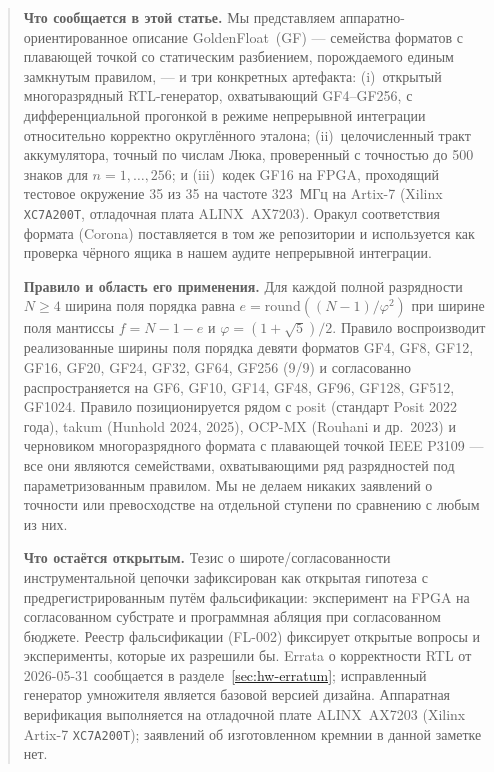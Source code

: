 \documentclass[11pt,a4paper]{article}
\theoremstyle{plain}
\begin{document}
\begin{abstract}
\noindent\textbf{Что сообщается в этой статье.}
Мы представляем аппаратно-ориентированное описание GoldenFloat~(GF) ---
семейства форматов с плавающей точкой со статическим разбиением, порождаемого
единым замкнутым правилом, --- и три конкретных артефакта: (i)~открытый
многоразрядный RTL-генератор, охватывающий GF4--GF256, с дифференциальной
прогонкой в режиме непрерывной интеграции относительно корректно округлённого
эталона; (ii)~целочисленный тракт аккумулятора, точный по числам Люка, проверенный с
точностью до 500 знаков для \(n = 1,\dots,256\); и (iii)~кодек GF16 на FPGA,
проходящий тестовое окружение 35 из 35 на частоте 323~МГц на Artix-7
(Xilinx \texttt{XC7A200T}, отладочная плата ALINX~AX7203). Оракул соответствия формата (Corona) поставляется в том же
репозитории и используется как проверка чёрного ящика в нашем аудите
непрерывной интеграции.

\noindent\textbf{Правило и область его применения.}
Для каждой полной разрядности \(N \ge 4\) ширина поля порядка равна
\(e = \mathrm{round}((N-1)/\varphi^{2})\) при ширине поля мантиссы
\(f = N-1-e\) и \(\varphi = (1+\sqrt{5})/2\). Правило воспроизводит
реализованные ширины поля порядка девяти форматов GF4, GF8, GF12, GF16, GF20,
GF24, GF32, GF64, GF256 (9/9) и согласованно распространяется на GF6, GF10,
GF14, GF48, GF96, GF128, GF512, GF1024. Правило позиционируется рядом с
posit (стандарт Posit 2022 года),
takum (Hunhold 2024, 2025), OCP-MX (Rouhani и др.\ 2023) и черновиком
многоразрядного формата с плавающей точкой IEEE P3109 --- все они являются
семействами, охватывающими ряд разрядностей под параметризованным правилом.
Мы не делаем никаких заявлений о точности или превосходстве на отдельной
ступени по сравнению с любым из них.

\noindent\textbf{Что остаётся открытым.}
Тезис о широте/согласованности инструментальной цепочки зафиксирован как
открытая гипотеза с предрегистрированным путём фальсификации: эксперимент на
FPGA на согласованном субстрате и программная абляция при согласованном
бюджете. Реестр фальсификации (FL-002) фиксирует открытые вопросы и
эксперименты, которые их разрешили бы. Errata о корректности RTL от 2026-05-31
сообщается в разделе~\ref{sec:hw-erratum}; исправленный генератор умножителя
является базовой версией дизайна. Аппаратная верификация выполняется на
отладочной плате ALINX~AX7203 (Xilinx Artix-7 \texttt{XC7A200T}); заявлений об
изготовленном кремнии в данной заметке нет.
\end{abstract}
\end{document}
